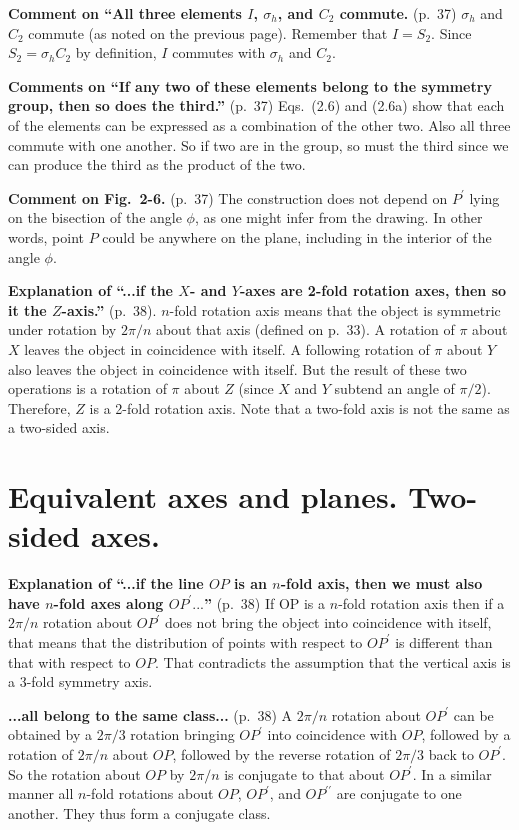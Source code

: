 {\bf Comment on ``All three elements $I$, $\sigma_h$, and $C_2$
  commute.} (p.\ 37) $\sigma_h$ and $C_2$ commute (as noted on the
previous page). Remember that $I = S_2$. Since $S_2 = \sigma_h C_2$ by
definition, $I$ commutes with $\sigma_h$ and $C_2$.

{\bf Comments on ``If any two of these elements belong to the symmetry
  group, then so does the third.''} (p.\ 37) Eqs.\ (2.6) and (2.6a)
show that each of the elements can be expressed as a combination of
the other two. Also all three commute with one another. So if two are
in the group, so must the third since we can produce the third as the
product of the two.

{\bf Comment on Fig.\ 2-6.} (p.\ 37) The construction does not depend
on $P^\prime$ lying on the bisection of the angle $\phi$, as one might
infer from the drawing. In other words, point $P$ could be anywhere on
the plane, including in the interior of the angle $\phi$.

{\bf Explanation of ``...if the $X$- and $Y$-axes are 2-fold rotation
  axes, then so it the $Z$-axis.''} (p.\ 38). $n$-fold rotation axis
means that the object is symmetric under rotation by $2\pi/n$ about
that axis (defined on p.\ 33).  A rotation of $\pi$ about $X$ leaves
the object in coincidence with itself. A following rotation of $\pi$
about $Y$ also leaves the object in coincidence with itself. But the
result of these two operations is a rotation of $\pi$ about $Z$ (since
$X$ and $Y$ subtend an angle of $\pi/2$). Therefore, $Z$ is a 2-fold
rotation axis. Note that a two-fold axis is not the same as a two-sided axis.

\section{Equivalent axes and planes. Two-sided axes.}

{\bf Explanation of ``...if the line $OP$ is an $n$-fold axis, then we
  must also have $n$-fold axes along $OP^\prime...$''} (p.\ 38) If OP
is a $n$-fold rotation axis then if a $2\pi/n$ rotation about $OP^\prime$
does not bring the object into coincidence with itself, that means
that the distribution of points with respect to $OP^\prime$ is
different than that with respect to $OP$. That contradicts the
assumption that the vertical axis is a 3-fold symmetry axis.

{\bf ...all belong to the same class...} (p.\ 38) A $2\pi/n$ rotation about
$OP^\prime$ can be obtained by a $2\pi/3$ rotation bringing $OP^\prime$ into
coincidence with $OP$, followed by a rotation of $2\pi/n$ about $OP$,
followed by the reverse rotation of $2\pi/3$ back to $OP^\prime$. So the
rotation about $OP$ by $2\pi/n$ is conjugate to that about $OP^\prime$. In a
similar manner all $n$-fold rotations about $OP$, $OP^\prime$, and
$OP^{\prime\prime}$ are conjugate to one another. They thus form a
conjugate class.

